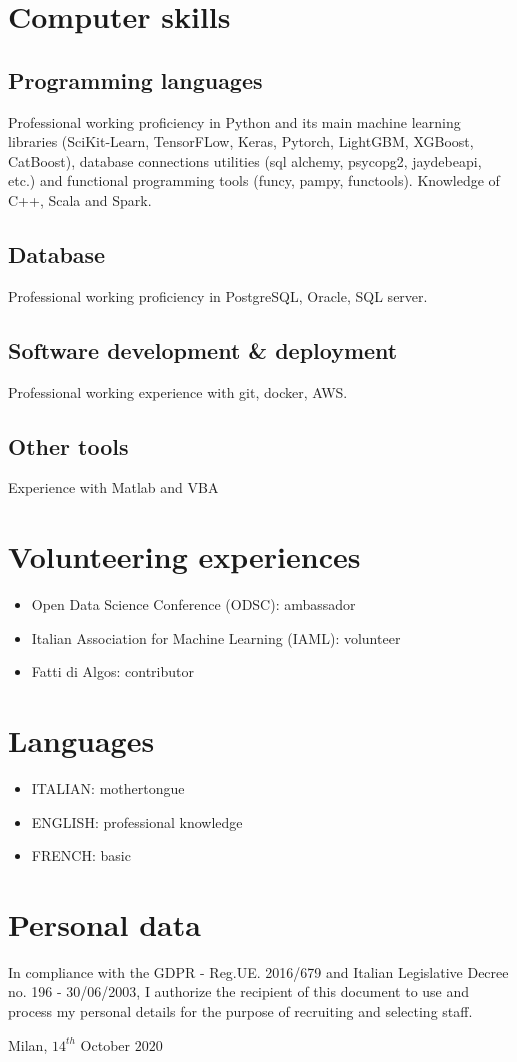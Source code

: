 \documentclass[11pt,a4paper,sans]{moderncv}        %
\begin{document}
\section{Computer skills}
\subsection{Programming languages}
Professional working proficiency in Python and its main machine learning libraries (SciKit-Learn, TensorFLow, Keras, Pytorch, LightGBM, XGBoost, CatBoost), database connections utilities (sql alchemy, psycopg2, jaydebeapi, etc.) and functional programming tools (funcy, pampy, functools). Knowledge of C++, Scala and Spark.
\subsection{Database}
Professional working proficiency in PostgreSQL, Oracle, SQL server.
\subsection{Software development \& deployment}
Professional working experience with git, docker, AWS.
\subsection{Other tools}
Experience with Matlab and VBA

\section{Volunteering experiences}
\begin{itemize}
 \item Open Data Science Conference (ODSC): ambassador
 \item Italian Association for Machine Learning (IAML): volunteer
 \item Fatti di Algos: contributor
\end{itemize} 

\section{Languages}
\begin{itemize}
 \item ITALIAN: mothertongue
 \item ENGLISH: professional knowledge
 \item FRENCH: basic
\end{itemize} 

\section{Personal data}
In compliance with the GDPR - Reg.UE. 2016/679 and Italian Legislative Decree no. 196 - 30/06/2003, I authorize the recipient of this document to use and process my personal details for the purpose of recruiting and selecting staff. 


\bigskip 
\bigskip
\bigskip 
\bigskip 
\bigskip 
\bigskip 
\bigskip 
Milan, $14^{th}$ October $2020$
\end{document}
